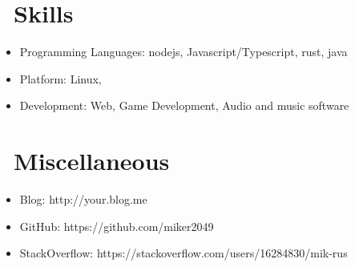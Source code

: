 \documentclass{resume}
\begin{document}

\section{\faCogs\ Skills}
\begin{itemize}[parsep=0.5ex]
  \item Programming Languages: nodejs, Javascript/Typescript, rust, java
  \item Platform: Linux,
  \item Development: Web, Game Development, Audio and music software
\end{itemize}


\section{\faInfo\ Miscellaneous}
\begin{itemize}[parsep=0.5ex]
  \item Blog: http://your.blog.me
  \item GitHub: https://github.com/miker2049
  \item StackOverflow: https://stackoverflow.com/users/16284830/mik-rus
\end{itemize}

%
%
\end{document}
